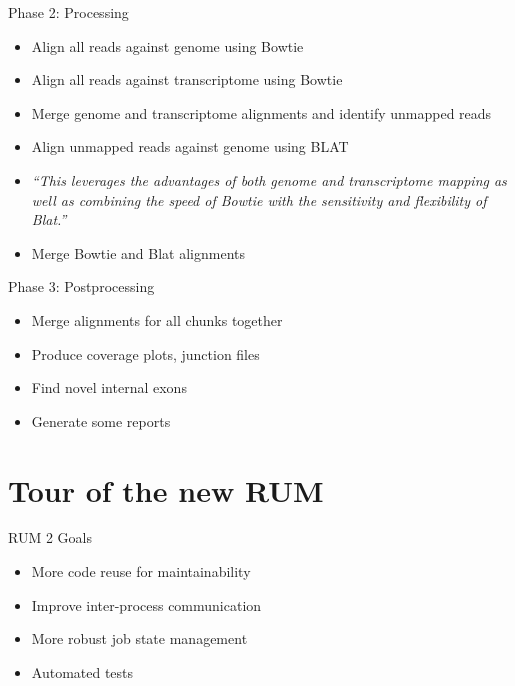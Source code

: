 \documentclass{beamer}
\begin{document}
\begin{frame}{Phase 2: Processing}

\begin{itemize}
  \item Align all reads against genome using Bowtie
  \item Align all reads against transcriptome using Bowtie
  \item Merge genome and transcriptome alignments and identify unmapped reads
  \item Align unmapped reads against genome using BLAT

  \item \textit{``This leverages the advantages of both genome and transcriptome mapping as well as combining the speed of Bowtie with the sensitivity and flexibility of Blat.''}

  \item Merge Bowtie and Blat alignments
\end{itemize}
\end{frame}

\begin{frame}{Phase 3: Postprocessing}

  \begin{itemize}
  \item Merge alignments for all chunks together
  \item Produce coverage plots, junction files
  \item Find novel internal exons
  \item Generate some reports
  \end{itemize}

\end{frame}

\section{Tour of the new RUM}

\begin{frame}{RUM 2 Goals}
  \begin{itemize}
  \item More code reuse for maintainability
  \item Improve inter-process communication
  \item More robust job state management
  \item Automated tests
  \end{itemize}
\end{frame}
\end{document}
